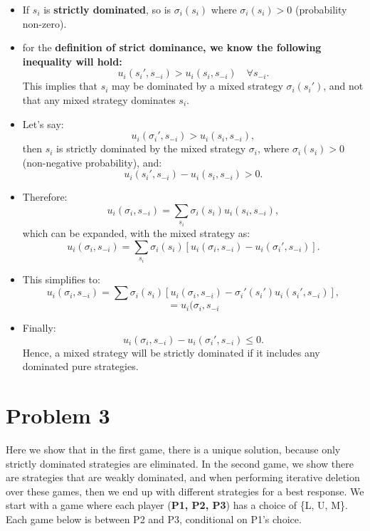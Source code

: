\documentclass{article}
\begin{document}
\begin{itemize}
    \item If $s_i$ is \textbf{strictly dominated}, so is $\sigma_i(s_i)$ where $\sigma_i(s_i) > 0$ (probability non-zero).
    
    \item for the \textbf{definition of strict dominance, we know the following inequality will hold:}
    \[
    u_i(s_i', s_{-i}) > u_i(s_i, s_{-i}) \quad \forall s_{-i}.
    \]
    This implies that $s_i$ may be dominated by a mixed strategy $\sigma_i(s_i')$, and not that any mixed strategy dominates $s_i$. 
    
    \item Let’s say:
    \[
    u_i(\sigma_i', s_{-i}) > u_i(s_i, s_{-i}),
    \]
    then $s_i$ is strictly dominated by the mixed strategy $\sigma_i$, where $\sigma_i(s_i) > 0$ (non-negative probability), and:
    \[
    u_i(s_i', s_{-i}) - u_i(s_i, s_{-i}) > 0.
    \]

    \item Therefore:
    \[
    u_i(\sigma_i, s_{-i}) = \sum_{s_i} \sigma_i(s_i) u_i(s_i, s_{-i}),
    \]
    which can be expanded, with the mixed strategy as:
    \[
    u_i(\sigma_i, s_{-i}) = \sum_{s_i} \sigma_i(s_i) \left[ u_i(\sigma_i, s_{-i}) - u_i(\sigma_i', s_{-i}) \right].
    \]


    \item This simplifies to:
    \[
    u_i(\sigma_i, s_{-i}) = \sum\sigma_i(s_i) \left[ u_i(\sigma_i, s_{-i}) - \sigma_i'(s_i')u_i(s_i', s_{-i}) \right],
    \]
    \[ = u_i(\sigma_i, s_{-i}
    \]
    \item Finally:
    \[
    u_i(\sigma_i, s_{-i}) - u_i(\sigma_i', s_{-i}) \leq 0.
    \]
    Hence, a mixed strategy will be strictly dominated if it includes any dominated pure strategies.
\end{itemize}

\section{Problem 3}
Here we show that in the first game, there is a unique solution, because only strictly dominated strategies are eliminated. In the second game, we show there are strategies that are weakly dominated, and when performing iterative deletion over these games, then we end up with different strategies for a best response. We start with a game where each player (\textbf{P1, P2, P3}) has a choice of \{L, U, M\}. Each game below is between P2 and P3, conditional on P1's choice. 
\end{document}
